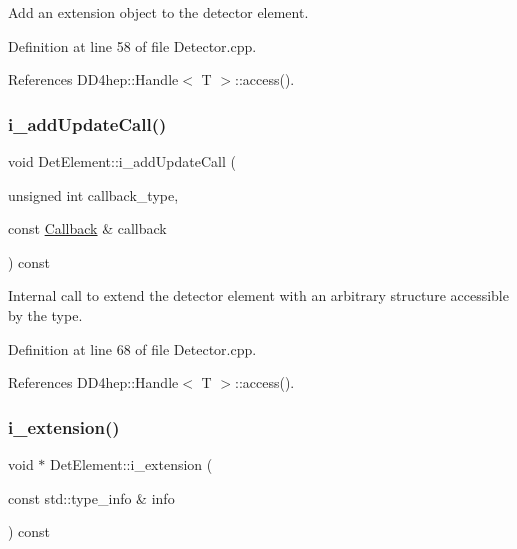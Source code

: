 Add an extension object to the detector element. 



Definition at line 58 of file Detector.\+cpp.



References D\+D4hep\+::\+Handle$<$ T $>$\+::access().

\hypertarget{class_d_d4hep_1_1_geometry_1_1_det_element_a7bc6c26e5ad1e4d32dc092462f5a769f}{}\label{class_d_d4hep_1_1_geometry_1_1_det_element_a7bc6c26e5ad1e4d32dc092462f5a769f} 
\subsubsection{\texorpdfstring{i\+\_\+add\+Update\+Call()}{i\_addUpdateCall()}}
{\footnotesize\ttfamily void Det\+Element\+::i\+\_\+add\+Update\+Call (\begin{DoxyParamCaption}\item[{unsigned int}]{callback\+\_\+type,  }\item[{const \hyperlink{class_d_d4hep_1_1_callback}{Callback} \&}]{callback }\end{DoxyParamCaption}) const\hspace{0.3cm}{\ttfamily [protected]}}



Internal call to extend the detector element with an arbitrary structure accessible by the type. 



Definition at line 68 of file Detector.\+cpp.



References D\+D4hep\+::\+Handle$<$ T $>$\+::access().

\hypertarget{class_d_d4hep_1_1_geometry_1_1_det_element_ae97132812d6af3937c6ede0c53698233}{}\label{class_d_d4hep_1_1_geometry_1_1_det_element_ae97132812d6af3937c6ede0c53698233} 
\subsubsection{\texorpdfstring{i\+\_\+extension()}{i\_extension()}}
{\footnotesize\ttfamily void $\ast$ Det\+Element\+::i\+\_\+extension (\begin{DoxyParamCaption}\item[{const std\+::type\+\_\+info \&}]{info }\end{DoxyParamCaption}) const\hspace{0.3cm}{\ttfamily [protected]}}



